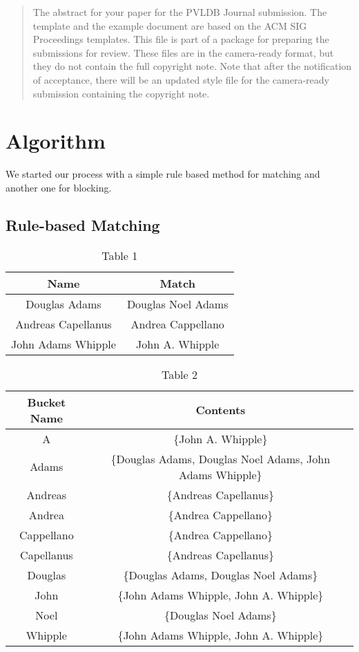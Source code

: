 \documentclass{vldb}
\begin{document}
\begin{abstract}
The abstract for your paper for the PVLDB Journal submission.
The template and the example document are based on the ACM SIG Proceedings  templates. This file is part of a package for preparing the submissions for review. These files are in the camera-ready format, but they do not contain the full copyright note.
Note that after the notification of acceptance, there will be an updated style file for the camera-ready submission containing the copyright note.
\end{abstract}




\section{Algorithm}
We started our process with a simple rule based method for matching and another one for blocking. 

\subsection{Rule-based Matching}
\begin{table}
\centering
\caption{Table 1}
\begin{tabular}{|c|c|} \hline
Name&Match\\ \hline
Douglas Adams&Douglas Noel Adams\\ \hline
Andreas Capellanus&Andrea Cappellano \\ \hline
John Adams Whipple&John A. Whipple \\
\hline\end{tabular}
\end{table}

\begin{table*}
\centering
\caption{Table 2}
\begin{tabular}{|c|c|} \hline
Bucket Name&Contents\\ \hline
A&\{John A. Whipple\} \\ \hline
Adams&\{Douglas Adams, Douglas Noel Adams, John Adams Whipple\} \\ \hline
Andreas&\{Andreas Capellanus\} \\ \hline
Andrea&\{Andrea Cappellano\} \\ \hline
Cappellano&\{Andrea Cappellano\} \\ \hline
Capellanus&\{Andreas Capellanus\} \\ \hline
Douglas&\{Douglas Adams, Douglas Noel Adams\} \\ \hline
John&\{John Adams Whipple, John A. Whipple\} \\ \hline
Noel&\{Douglas Noel Adams\} \\ \hline
Whipple&\{John Adams Whipple, John A. Whipple\} \\
\hline\end{tabular}
\end{table*}
\end{document}
